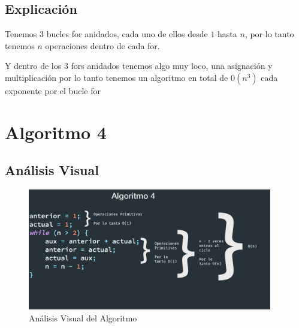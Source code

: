 \documentclass[12pt, fleqn]{article}                            %
\theoremstyle{break}                                            %
\begin{document}
    \subsection{Explicación}

        Tenemos 3 bucles for anidados, cada uno de ellos desde $1$ hasta $n$, 
        por lo tanto tenemos $n$ operaciones dentro de cada for.

        Y dentro de los 3 fors anidados tenemos algo muy loco, una asignación y multiplicación
        por lo tanto tenemos un algoritmo en total de $0(n^3)$ cada exponente por el bucle for







\clearpage
\section{Algoritmo 4}


    \subsection{Análisis Visual}

        \begin{figure}[h]
            \centering
            \includegraphics[width=0.95\textwidth]{Algoritmo4}
            \caption{Análisis Visual del Algoritmo}
        \end{figure}

    \vspace{1em}
\end{document}

